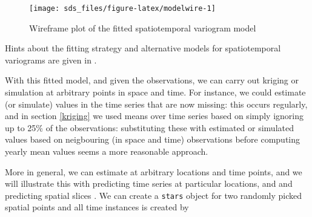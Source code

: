 \documentclass[]{book}
\newenvironment{Shaded}{\begin{snugshade}}{\end{snugshade}}
\newcommand{\DataTypeTok}[1]{\textcolor[rgb]{0.13,0.29,0.53}{#1}}
\newcommand{\DecValTok}[1]{\textcolor[rgb]{0.00,0.00,0.81}{#1}}
\newcommand{\KeywordTok}[1]{\textcolor[rgb]{0.13,0.29,0.53}{\textbf{#1}}}
\newcommand{\NormalTok}[1]{#1}
\newcommand{\OperatorTok}[1]{\textcolor[rgb]{0.81,0.36,0.00}{\textbf{#1}}}
\newcommand{\StringTok}[1]{\textcolor[rgb]{0.31,0.60,0.02}{#1}}
\begin{document}
\begin{figure}

{\centering \texttt{[image: sds\_files/figure-latex/modelwire-1]} 

}

\caption{Wireframe plot of the fitted spatiotemporal variogram model}\label{fig:modelwire}
\end{figure}

Hints about the fitting strategy and alternative models for
spatiotemporal variograms are given in \citep{RJ-2016-014}.

With this fitted model, and given the observations, we can
carry out kriging or simulation at arbitrary points in space and
time. For instance, we could estimate (or simulate) values in the
time series that are now missing: this occurs regularly, and in
section \ref{kriging} we used means over time series based on
simply ignoring up to 25\% of the observations: substituting these
with estimated or simulated values based on neigbouring (in space
and time) observations before computing yearly mean values seems
a more reasonable approach.

More in general, we can estimate at arbitrary locations and time
points, and we will illustrate this with predicting time series at
particular locations, and and predicting spatial slices \citep{RJ-2016-014}.
We can create
a \texttt{stars} object for two randomly picked spatial points and all time instances
is created by

\begin{Shaded}
\end{Shaded}
\end{document}
